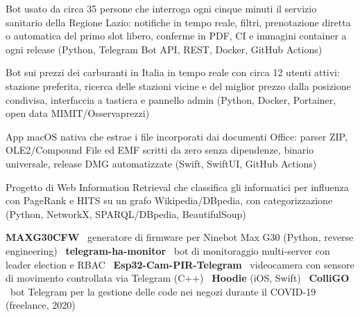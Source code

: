 \documentclass[a4paper,10pt]{article}
\begin{document}
\begin{cvitems}
  \item Bot usato da circa 35 persone che interroga ogni cinque minuti il servizio sanitario della Regione Lazio: notifiche in tempo reale, filtri, prenotazione diretta o automatica del primo slot libero, conferme in PDF, CI e immagini container a ogni release (Python, Telegram Bot API, REST, Docker, GitHub Actions)
\end{cvitems}

\begin{cvitems}
  \item Bot sui prezzi dei carburanti in Italia in tempo reale con circa 12 utenti attivi: stazione preferita, ricerca delle stazioni vicine e del miglior prezzo dalla posizione condivisa, interfaccia a tastiera e pannello admin (Python, Docker, Portainer, open data MIMIT/Osservaprezzi)
\end{cvitems}

\begin{cvitems}
  \item App macOS nativa che estrae i file incorporati dai documenti Office: parser ZIP, OLE2/Compound File ed EMF scritti da zero senza dipendenze, binario universale, release DMG automatizzate (Swift, SwiftUI, GitHub Actions)
\end{cvitems}

\begin{cvitems}
  \item Progetto di Web Information Retrieval che classifica gli informatici per influenza con PageRank e HITS su un grafo Wikipedia/DBpedia, con categorizzazione (Python, NetworkX, SPARQL/DBpedia, BeautifulSoup)
\end{cvitems}

\begin{cvitems}
  \item \textbf{MAXG30CFW} \textendash\ generatore di firmware per Ninebot Max G30 (Python, reverse engineering) \cvsep\ \textbf{telegram-ha-monitor} \textendash\ bot di monitoraggio multi-server con leader election e RBAC \cvsep\ \textbf{Esp32-Cam-PIR-Telegram} \textendash\ videocamera con sensore di movimento controllata via Telegram (C++) \cvsep\ \textbf{Hoodie} (iOS, Swift) \cvsep\ \textbf{ColliGO} \textendash\ bot Telegram per la gestione delle code nei negozi durante il COVID-19 (freelance, 2020)
\end{cvitems}
\end{document}
